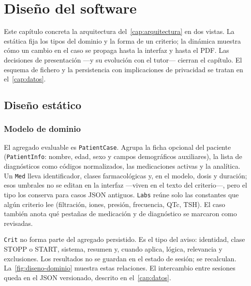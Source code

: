 
\chapter{Diseño del software}
\label{cap:diseno}

Este capítulo concreta la arquitectura del~\cref{cap:arquitectura} en
dos vistas. La estática fija los tipos del dominio y la forma de un
criterio; la dinámica muestra cómo un cambio en el caso se propaga
hasta la interfaz y hasta el PDF. Las decisiones de presentación ---y
su evolución con el tutor--- cierran el capítulo. El esquema de
fichero y la persistencia con implicaciones de privacidad se tratan en
el~\cref{cap:datos}.

\section{Diseño estático}

\subsection{Modelo de dominio}

El agregado evaluable es \texttt{PatientCase}. Agrupa la ficha
opcional del paciente (\texttt{PatientInfo}: nombre, edad, sexo y
campos demográficos auxiliares), la lista de diagnósticos como códigos
normalizados, las medicaciones activas y la analítica. Un
\texttt{Med} lleva identificador, clases farmacológicas y, en el
modelo, dosis y duración; esos umbrales no se editan en la interfaz
---viven en el texto del criterio---, pero el tipo los conserva para
casos JSON antiguos. \texttt{Labs} reúne solo las constantes que
algún criterio lee (filtración, iones, presión, frecuencia, QTc, TSH).
El caso también anota qué pestañas de medicación y de diagnóstico se
marcaron como revisadas.

\texttt{Crit} no forma parte del agregado persistido. Es el tipo del
aviso: identidad, clase STOPP o START, sistema, resumen y, cuando
aplica, lógica, relevancia y exclusiones. Los resultados no se
guardan en el estado de sesión; se recalculan. La~\cref{fig:diseno-dominio}
muestra estas relaciones. El intercambio entre sesiones queda en el JSON
versionado, descrito en el~\cref{cap:datos}.

